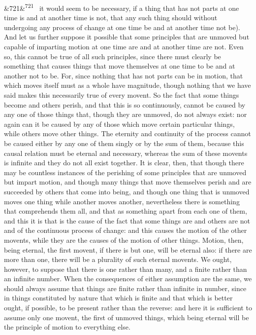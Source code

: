 \documentclass[12pt]{article}
\newcommand{\para}[1][]{\par\noindent\ifx&#1&\else\textsuperscript{\footnotesize #1}~\fi}
\begin{document}
\para[721] it would seem to be necessary, if a thing that has not parts at one time is and at another time is not, that any such thing should without undergoing any process of change at one time be and at another time not be). And let us further suppose it possible that some principles that are unmoved but capable of imparting motion at one time are and at another time are not. Even so, this cannot be true of all such principles, since there must clearly be something that causes things that move themselves at one time to be and at another not to be. For, since nothing that has not parts can be in motion, that which moves itself must as a whole have magnitude, though nothing that we have said makes this necessarily true of every movent. So the fact that some things become and others perish, and that this is so continuously, cannot be caused by any one of those things that, though they are unmoved, do not always exist: nor again can it be caused by any of those which move certain particular things, while others move other things. The eternity and continuity of the process cannot be caused either by any one of them singly or by the sum of them, because this causal relation must be eternal and necessary, whereas the sum of these movents is infinite and they do not all exist together. It is clear, then, that though there may be countless instances of the perishing of some principles that are unmoved but impart motion, and though many things that move themselves perish and are succeeded by others that come into being, and though one thing that is unmoved moves one thing while another moves another, nevertheless there is something that comprehends them all, and that as something apart from each one of them, and this it is that is the cause of the fact that some things are and others are not and of the continuous process of change: and this causes the motion of the other movents, while they are the causes of the motion of other things. Motion, then, being eternal, the first movent, if there is but one, will be eternal also: if there are more than one, there will be a plurality of such eternal movents. We ought, however, to suppose that there is one rather than many, and a finite rather than an infinite number. When the consequences of either assumption are the same, we should always assume that things are finite rather than infinite in number, since in things constituted by nature that which is finite and that which is better ought, if possible, to be present rather than the reverse: and here it is sufficient to assume only one movent, the first of unmoved things, which being eternal will be the principle of motion to everything else.
\end{document}
